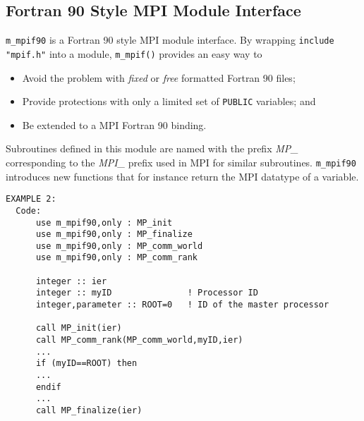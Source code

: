 \subsection{Fortran 90 Style MPI Module Interface}
{\tt m\_mpif90} is a Fortran 90 style MPI module interface.
By wrapping \verb'include "mpif.h"' into a module, \verb"m_mpif()"
provides an easy way to
%
\begin{itemize}
\item Avoid the problem with {\sl fixed} or {\sl free} formatted
      Fortran 90 files;
\item Provide protections with only a limited set of \verb"PUBLIC"
      variables; and
\item Be extended to a MPI Fortran 90 binding.
\end{itemize}
%
Subroutines defined in this module are named with the prefix
{\sl MP\_} corresponding to the {\sl MPI\_} prefix used in MPI
for similar subroutines.
{\tt m\_mpif90} introduces new functions that for instance return
the MPI datatype of a variable.
%
\begin{verbatim}
EXAMPLE 2:
  Code:
      use m_mpif90,only : MP_init
      use m_mpif90,only : MP_finalize
      use m_mpif90,only : MP_comm_world
      use m_mpif90,only : MP_comm_rank

      integer :: ier
      integer :: myID               ! Processor ID
      integer,parameter :: ROOT=0   ! ID of the master processor
      
      call MP_init(ier)
      call MP_comm_rank(MP_comm_world,myID,ier)
      ...
      if (myID==ROOT) then
      ...
      endif
      ...
      call MP_finalize(ier)
\end{verbatim}
%
